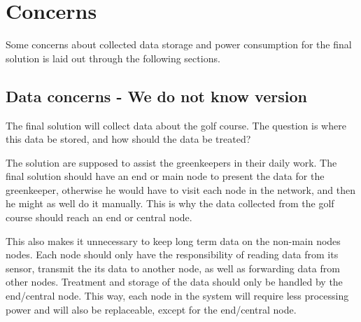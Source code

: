 \section{Concerns}
Some concerns about collected data storage and power consumption for the final solution is laid out through the following sections.

\subsection{Data concerns - We do not know version}
The final solution will collect data about the golf course. The question is where this data be stored, and how should the data be treated?

The solution are supposed to assist the greenkeepers in their daily work. The final solution should have an end or main node to present the data for the greenkeeper, otherwise he would have to visit each node in the network, and then he might as well do it manually. This is why the data collected from the golf course should reach an end or central node.

This also makes it unnecessary to keep long term data on the non-main nodes nodes. Each node should only have the responsibility of reading data from its sensor, transmit the its data to another node, as well as forwarding data from other nodes. Treatment and storage of the data should only be handled by the end/central node. This way, each node in the system will require less processing power and will also be replaceable, except for the end/central node.



